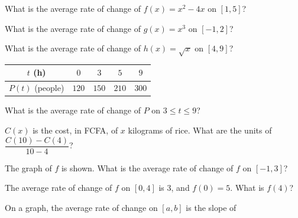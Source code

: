 \begin{exo}{}
What is the average rate of change of $f(x)=x^2-4x$ on $[1,5]$?
\end{exo}
\begin{exo}{}
What is the average rate of change of $g(x)=x^3$ on $[-1,2]$?
\end{exo}
\begin{exo}{}
What is the average rate of change of $h(x)=\sqrt x$ on $[4,9]$?
\end{exo}
\begin{exo}{}
\begin{tabular}{|c|c|c|c|c|}\hline$t$ (h)&$0$&$3$&$5$&$9$\\\hline$P(t)$ (people)&$120$&$150$&$210$&$300$\\\hline\end{tabular}\; What is the average rate of change of $P$ on $3\le t\le9$?
\end{exo}
\begin{exo}{}
$C(x)$ is the cost, in FCFA, of $x$ kilograms of rice. What are the units of $\dfrac{C(10)-C(4)}{10-4}$?
\end{exo}
\begin{exo}{}
The graph of $f$ is shown. What is the average rate of change of $f$ on $[-1,3]$?
\end{exo}
\begin{exo}{}
The average rate of change of $f$ on $[0,4]$ is $3$, and $f(0)=5$. What is $f(4)$?
\end{exo}
\begin{exo}{}
On a graph, the average rate of change on $[a,b]$ is the slope of
\end{exo}
